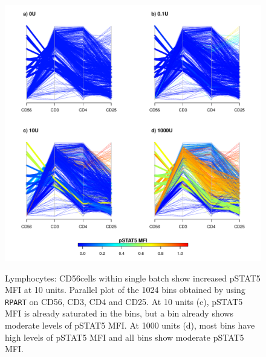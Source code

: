\begin{figure}
\centering
\begin{minipage}{.65\textwidth}
\includegraphics[width=\linewidth]{figures/lymphocytes-KM00782Z-2012-07-23}
\end{minipage}
\begin{minipage}{.3\textwidth}
{  Lymphocytes: CD56\high cells within single batch show increased pSTAT5 MFI at 10 units. }
{ Parallel plot of the 1024 bins obtained by using \texttt{RPART} on CD56, CD3, CD4 and CD25.  At 10 units (c), pSTAT5 MFI is already saturated in the \high bins, but a \high bin already shows moderate levels of pSTAT5 MFI.  At 1000 units (d), most bins have high levels of pSTAT5 MFI and all \positive bins show moderate pSTAT5 MFI.  }
\end{minipage}
%
\begin{minipage}{.65\textwidth}

\end{minipage}
\end{figure}
